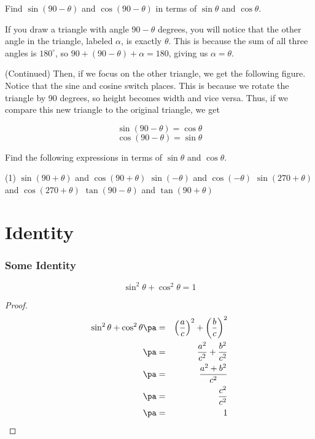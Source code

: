 \begin{frame}[t]
\begin{ex}
Find $\sin (90 - \theta)$ and $\cos (90 - \theta)$ in terms of $\sin \theta$ and $\cos \theta$.
\end{ex}
\begin{sol}
If you draw a triangle with angle $90 - \theta$ degrees, you will notice that the other angle in the triangle, labeled $\alpha$, is exactly $\theta$. This is because the sum of all three angles is $180^{\circ}$, so $90 + (90 - \theta) + \alpha = 180$, giving us $\alpha = \theta$.
\end{sol}
\end{frame}

\begin{frame}[t]
\begin{sol} (Continued)
Then, if we focus on the other triangle, we get the following figure.
Notice that the sine and cosine switch places. This is because we rotate the triangle by 90 degrees, so height becomes width and vice versa. Thus, if we compare this new triangle to the original triangle, we get

\[\sin (90 - \theta) = \cos \theta\]
\[\cos (90 - \theta) = \sin \theta \]
\end{sol}
\end{frame}

\begin{frame}
\begin{exercisebox}{}{}
Find the following expressions in terms of $\sin \theta$ and $\cos \theta$.
\begin{tasks}(1)
\task $\sin (90 + \theta)$ and $\cos (90 + \theta)$
\task $\sin (- \theta)$ and $\cos (- \theta)$
\task $\sin (270 + \theta)$ and $\cos (270 + \theta)$
\task $\tan (90 - \theta)$ and $\tan (90 + \theta)$
\end{tasks}
\end{exercisebox}
\end{frame}

\section{Identity}
\frame{\sectionpage}

\begin{frame}[t]
\frametitle{Some Identity}
\begin{block}{}
\[\sin^2 \theta + \cos^2 \theta = 1\]
\end{block}

\begin{proof}
\begin{eqnarray*}
\sin^2 \theta + \cos^2 \theta \pa &=& \left(\frac{a}{c}\right)^2 + \left(\frac{b}{c}\right)^2 \\
\pa &=& \frac{a^2}{c^2} + \frac{b^2}{c^2} \\
\pa &=& \frac{a^2 + b^2}{c^2} \\
\pa &=& \frac{c^2}{c^2}  \\
\pa &=& 1
\end{eqnarray*}
\end{proof}
\end{frame}

